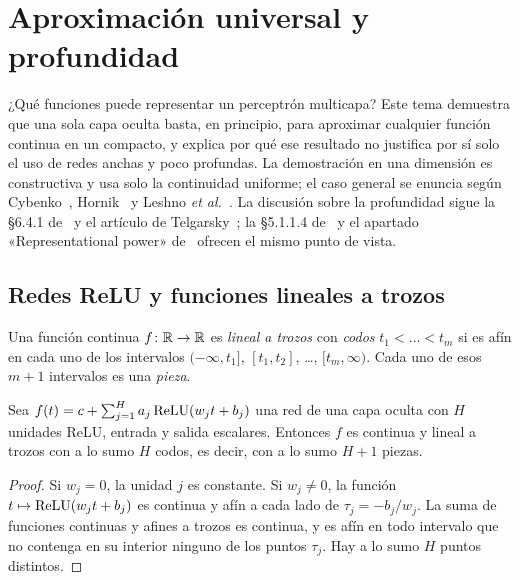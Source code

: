 \chapter{Aproximación universal y profundidad}
\label{tema:3}

¿Qué funciones puede representar un perceptrón multicapa? Este tema demuestra que una sola capa oculta basta, en principio, para aproximar cualquier función continua en un compacto, y explica por qué ese resultado no justifica por sí solo el uso de redes anchas y poco profundas. La demostración en una dimensión es constructiva y usa solo la continuidad uniforme; el caso general se enuncia según Cybenko~\cite{cybenko}, Hornik~\cite{hornik} y Leshno \emph{et al.}~\cite{leshno}. La discusión sobre la profundidad sigue la §6.4.1 de~\cite{gbc} y el artículo de Telgarsky~\cite{telgarsky}; la §5.1.1.4 de~\cite{d2l} y el apartado «Representational power» de~\cite{cs231n} ofrecen el mismo punto de vista.

\section{Redes ReLU y funciones lineales a trozos}

\begin{definicion}
Una función continua $f\colon\mathbb{R}\to\mathbb{R}$ es \emph{lineal a trozos} con \emph{codos} $t_1<\dots<t_m$ si es afín en cada uno de los intervalos $(-\infty,t_1]$, $[t_1,t_2]$, \dots, $[t_m,\infty)$. Cada uno de esos $m+1$ intervalos es una \emph{pieza}.
\end{definicion}

\begin{proposicion}\label{prop:piezas}
Sea $f(t)=c+\sum_{j=1}^{H}a_j\operatorname{ReLU}(w_jt+b_j)$ una red de una capa oculta con $H$ unidades ReLU, entrada y salida escalares. Entonces $f$ es continua y lineal a trozos con a lo sumo $H$ codos, es decir, con a lo sumo $H+1$ piezas.
\end{proposicion}

\begin{proof}
Si $w_j=0$, la unidad $j$ es constante. Si $w_j\neq 0$, la función $t\mapsto\operatorname{ReLU}(w_jt+b_j)$ es continua y afín a cada lado de $\tau_j=-b_j/w_j$. La suma de funciones continuas y afines a trozos es continua, y es afín en todo intervalo que no contenga en su interior ninguno de los puntos $\tau_j$. Hay a lo sumo $H$ puntos distintos.
\end{proof}

